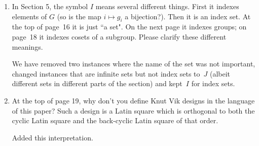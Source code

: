 \documentclass[12pt,a4paper]{article}
\newenvironment{QandA}{\begin{enumerate}[label=\bfseries\alph*.]\bfseries}
                      {\end{enumerate}}
\newenvironment{answered}{\par\normalfont}{}
\begin{document}
\begin{QandA}
\item In Section 5, the symbol $I$ means several different things. First it indexes elements of $G$ (so is the map $i \mapsto g_i$ a bijection?). Then it is an index set. At the top of page~16 it is just ``a set". On the next page it indexes groups; on page~18 it indexes cosets of a subgroup. Please clarify these different meanings.


\begin{answered}
We have removed two instances where the name of the set was not important, changed instances that are infinite sets but not index sets to~$J$ (albeit different sets in different parts of the section) and kept~$I$ for index sets. 
\end{answered}

\item At the top of page 19, why don't you define Knut Vik designs in the language of this paper? Such a design is a Latin square which is orthogonal to both the cyclic Latin square and the back-cyclic Latin square of that order.



\begin{answered}
Added this interpretation.
\end{answered}


\end{QandA}
\end{document}
